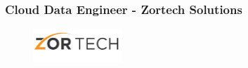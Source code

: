 \documentclass[12pt]{article}
\begin{document}
\begin{enumerate}
                \end{enumerate}




            \subsubsection{Cloud Data Engineer - Zortech Solutions}

                \begin{figure}[!h]
                    \centering
                    \includegraphics[width=0.3\textwidth]{Recursos/Img/ZortechLogo.png}
                \end{figure}
\end{document}
